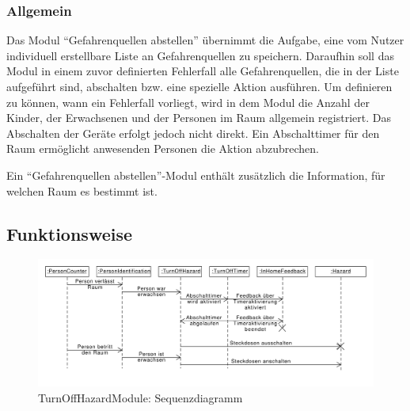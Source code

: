 \subsubsection{Allgemein}
Das Modul "`Gefahrenquellen abstellen"' übernimmt die Aufgabe, eine vom Nutzer individuell erstellbare Liste an Gefahrenquellen zu speichern. Daraufhin soll das Modul in einem zuvor definierten Fehlerfall alle Gefahrenquellen, die in der Liste aufgeführt sind, abschalten bzw. eine spezielle Aktion ausführen. Um definieren zu können, wann ein Fehlerfall vorliegt, wird in dem Modul die Anzahl der Kinder, der Erwachsenen und der Personen im Raum allgemein registriert. Das Abschalten der Geräte erfolgt jedoch nicht direkt. Ein Abschalttimer für den Raum ermöglicht anwesenden Personen die Aktion abzubrechen.

Ein "`Gefahrenquellen abstellen"'-Modul enthält zusätzlich die Information, für welchen Raum es bestimmt ist.

\subsection{Funktionsweise}
\begin{figure}[h!]
	\centering
	\includegraphics[width=\textwidth]{img/Modulkonzeption/TurnOffHazardSequence.pdf}
	\caption{TurnOffHazardModule: Sequenzdiagramm}
	\label{fig:turnOffHazard}
\end{figure}


